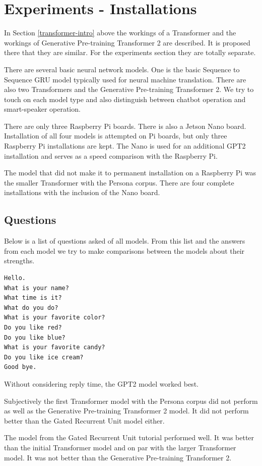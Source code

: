 

\section{Experiments - Installations}
In Section \ref{transformer-intro} above the workings of a Transformer and the workings of Generative Pre-training Transformer 2 are described. It is proposed there that they are similar. For the experiments section they are totally separate.

There are several basic neural network models. One is the basic Sequence to Sequence GRU model typically used for neural machine translation. There are also two Transformers and the Generative Pre-training Transformer 2. We try to touch on each model type and also distinguish between chatbot operation and smart-speaker operation. 

There are only three Raspberry Pi boards. There is also a Jetson Nano board. Installation of all four models is attempted on Pi boards, but only three Raspberry Pi installations are kept. The Nano is used for an additional GPT2 installation and serves as a speed comparison with the Raspberry Pi. 

The model that did not make it to permanent installation on a Raspberry Pi was the smaller Transformer with the Persona corpus. There are four complete installations with the inclusion of the Nano board.

\subsection{Questions}
Below is a list of questions asked of all models. From this list and the answers from each model we try to make comparisons between the models about their strengths.

\begin{verbatim}
Hello.
What is your name? 
What time is it?
What do you do?
What is your favorite color?
Do you like red?
Do you like blue?
What is your favorite candy?
Do you like ice cream?
Good bye.
\end{verbatim}

Without considering reply time, the GPT2 model worked best. 

Subjectively the first Transformer model with the Persona corpus did not perform as well as the Generative Pre-training Transformer 2 model. It did not perform better than the Gated Recurrent Unit model either. 

The model from the Gated Recurrent Unit tutorial performed well. It was better than the initial Transformer model and on par with the larger Transformer model. It was not better than the Generative Pre-training Transformer 2.

